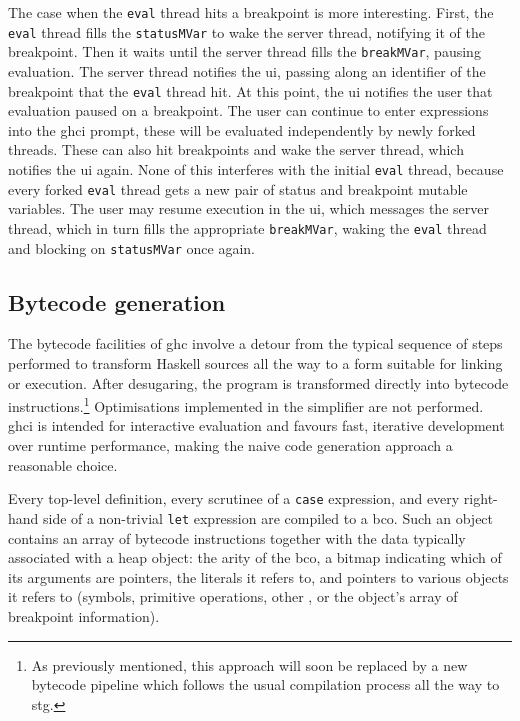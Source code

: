 \documentclass[thesis=B,english]{FITthesis}[2019/12/23]
\newcommand{\hsIdent}[1]{\texttt{#1}}
\newcommand{\hsCode}[1]{\texttt{#1}}
\begin{document}
The case when the \texttt{eval} thread hits a breakpoint is more interesting.
First, the \texttt{eval} thread fills the \hsIdent{statusMVar} to wake the
server thread, notifying it of the breakpoint. Then it waits until the server
thread fills the \hsIdent{breakMVar}, pausing evaluation. The server thread
notifies the \acrshort{ui}, passing along an identifier of the breakpoint that
the \texttt{eval} thread hit. At this point, the \acrshort{ui} notifies the
user that evaluation paused on a breakpoint. The user can continue to enter
expressions into the \acrshort{ghci} prompt, these will be evaluated
independently by newly forked threads. These can also hit breakpoints and wake
the server thread, which notifies the \acrshort{ui} again. None of this
interferes with the initial \texttt{eval} thread, because every forked
\texttt{eval} thread gets a new pair of status and breakpoint mutable
variables. The user may resume execution in the \acrshort{ui}, which messages
the server thread, which in turn fills the appropriate \hsIdent{breakMVar},
waking the \texttt{eval} thread and blocking on \hsIdent{statusMVar} once
again.

\subsection*{Bytecode generation}
The bytecode facilities of \acrshort{ghc} involve a detour from the typical
sequence of steps performed to transform Haskell sources all the way to a form
suitable for linking or execution. After desugaring, the program is transformed
directly into bytecode instructions.\footnote{
	As previously mentioned, this approach will soon be replaced by a new
	bytecode pipeline which follows the usual compilation process all the way
	to \acrshort{stg}\cite{mr-ghci-stg-unboxed}.
} Optimisations implemented in the simplifier are not performed.
\acrshort{ghci} is intended for interactive evaluation and favours fast,
iterative development over runtime performance, making the naive code
generation approach a reasonable choice.

Every top-level definition, every scrutinee of a \hsCode{case} expression, and
every right-hand side of a non-trivial \hsCode{let} expression are compiled to
a \acrfull{bco}. Such an object contains an array of bytecode instructions
together with the data typically associated with a heap object: the arity of
the \acrshort{bco}, a bitmap indicating which of its arguments are pointers,
the literals it refers to, and pointers to various objects it refers to
(symbols, primitive operations, other , or the object's array
of breakpoint information).
\end{document}
